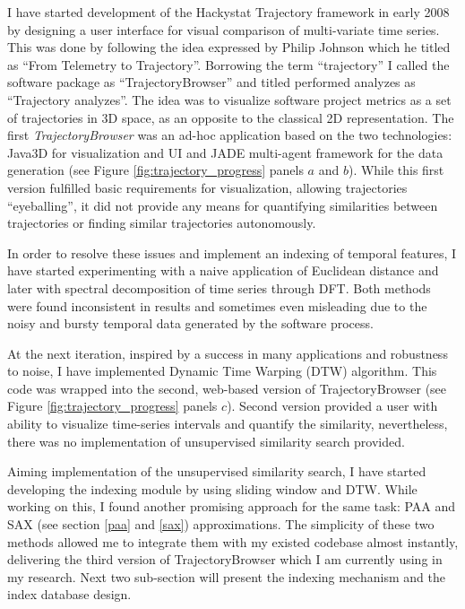 I have started development of the Hackystat Trajectory framework in early 2008 by designing a user interface for visual comparison of multi-variate time series. This was done by following the idea expressed by Philip Johnson which he titled as ``From Telemetry to Trajectory''. Borrowing the term ``trajectory'' I called the software package as ``TrajectoryBrowser'' and titled performed analyzes as ``Trajectory analyzes''. The idea was to visualize software project metrics as a set of trajectories in 3D space, as an opposite to the classical 2D representation. The first \textit{TrajectoryBrowser} was an ad-hoc application based on the two technologies: Java3D for visualization and UI and JADE multi-agent framework \cite{citeulike:1230319} for the data generation (see Figure \ref{fig:trajectory_progress} panels $a$ and $b$). While this first version fulfilled basic requirements for visualization, allowing trajectories ``eyeballing'', it did not provide any means for quantifying similarities between trajectories or finding similar trajectories autonomously.

In order to resolve these issues and implement an indexing of temporal features, I have started experimenting with a naive application of Euclidean distance and later with spectral decomposition of time series through DFT. Both methods were found inconsistent in results and sometimes even misleading due to the noisy and bursty temporal data generated by the software process. 

At the next iteration, inspired by a success in many applications and robustness to noise, I have implemented Dynamic Time Warping (DTW) algorithm. This code was wrapped into the second, web-based version of TrajectoryBrowser (see Figure \ref{fig:trajectory_progress} panels $c$). Second version provided a user with ability to visualize time-series intervals and quantify the similarity, nevertheless, there was no implementation of unsupervised similarity search provided.

Aiming implementation of the unsupervised similarity search, I have started developing the indexing module by using sliding window and DTW. While working on this, I found another promising approach for the same task: PAA and SAX (see section \ref{paa} and \ref{sax}) approximations. The simplicity of these two methods allowed me to integrate them with my existed codebase almost instantly, delivering the third version of TrajectoryBrowser which I am currently using in my research. Next two sub-section will present the indexing mechanism and the index database design. 

